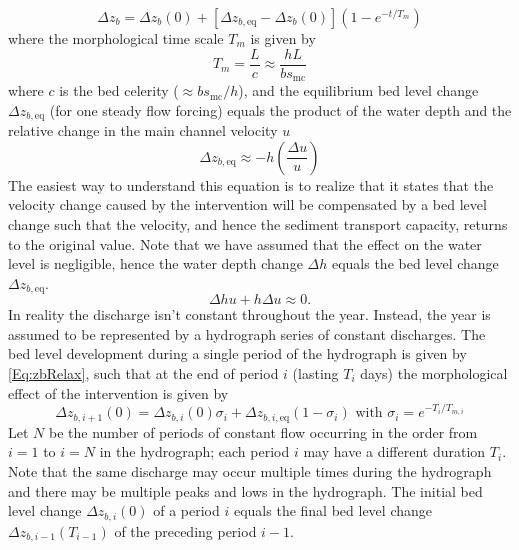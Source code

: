 %
\begin{equation}
\Delta z_b = \Delta z_b (0) + [\Delta z_{b,\text{eq}} - \Delta z_b(0)](1 - e^{-t/T_m})
\label{Eq:zbRelax}
\end{equation}
%
where the morphological time scale $T_m$ is given by
%
\begin{equation}
T_m = \frac{L}{c} \approx \frac{h L}{b s_\text{mc}}
\label{Eq:MorTimeScale}
\end{equation}
%
where $c$ is the bed celerity \unitbrackets{\SI{}{\metre\per\second}} ($\approx b s_\text{mc} / h$), and the equilibrium bed level change $\Delta z_{b,\text{eq}}$ (for one steady flow forcing) equals the product of the water depth and the relative change in the main channel velocity $u$ 
%
\begin{equation}
\Delta z_{b,\text{eq}} \approx -h \left ( \frac{\Delta u}{u} \right )
\label{Eq:zbEqui}
\end{equation}
%
The easiest way to understand this equation is to realize that it states that the velocity change caused by the intervention will be compensated by a bed level change such that the velocity, and hence the sediment transport capacity, returns to the original value.
Note that we have assumed that the effect on the water level is negligible, hence the water depth change $\Delta h$ equals the bed level change $\Delta z_{b,\text{eq}}$.
%
\begin{equation}
\Delta h u + h \Delta u \approx 0.
\label{Eq:zbEqui2}
\end{equation}
%
In reality the discharge isn't constant throughout the year.
Instead, the year is assumed to be represented by a hydrograph series of constant discharges.
The bed level development during a single period of the hydrograph is given by \autoref{Eq:zbRelax}, such that at the end of period $i$ (lasting $T_i$ days) the morphological effect of the intervention is given by
%
\begin{equation}
\Delta z_{b,i+1}(0) = \Delta z_{b,i} (0) \sigma_i + \Delta z_{b,i,\text{eq}} (1-\sigma_i) \text{ with } \sigma_i = e^{-T_i/T_{m,i}}
\label{Eq:zbOverTime}
\end{equation}
%
Let $N$ be the number of periods of constant flow occurring in the order from $i=1$ to $i=N$ in the hydrograph; each period $i$ may have a different duration $T_i$.
Note that the same discharge may occur multiple times during the hydrograph and there may be multiple peaks and lows in the hydrograph.
The initial bed level change $\Delta z_{b,i}(0)$ of a period $i$ equals the final bed level change $\Delta z_{b,i-1}(T_{i-1})$ of the preceding period $i-1$.
